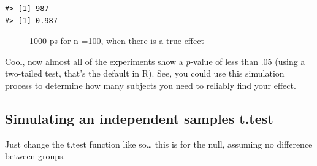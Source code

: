 \documentclass[
  letterpaper,
  DIV=11,
  numbers=noendperiod]{scrreprt}
\begin{document}
\begin{verbatim}
#> [1] 987
#> [1] 0.987
\end{verbatim}

\begin{figure}


\caption{\label{fig-7simpsB}1000 ps for n =100, when there is a true
effect}

\end{figure}%

Cool, now almost all of the experiments show a \(p\)-value of less than
.05 (using a two-tailed test, that's the default in R). See, you could
use this simulation process to determine how many subjects you need to
reliably find your effect.

\subsection{Simulating an independent samples
t.test}\label{simulating-an-independent-samples-t.test}

Just change the t.test function like so\ldots{} this is for the null,
assuming no difference between groups.
\end{document}
